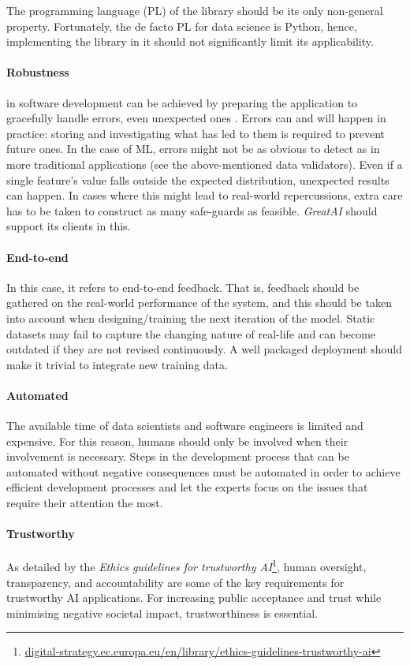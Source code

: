 The programming language (PL) of the library should be its only non-general property. Fortunately, the de facto PL for data science is Python, hence, implementing the library in it should not significantly limit its applicability.

\paragraph{Robustness} in software development can be achieved by preparing the application to gracefully handle errors, even unexpected ones \cite{bishop1998robust}. Errors can and will happen in practice: storing and investigating what has led to them is required to prevent future ones. In the case of ML, errors might not be as obvious to detect as in more traditional applications (see the above-mentioned data validators). Even if a single feature's value falls outside the expected distribution, unexpected results can happen. In cases where this might lead to real-world repercussions, extra care has to be taken to construct as many safe-guards as feasible. \textit{GreatAI} should support its clients in this.

\paragraph{End-to-end} In this case, it refers to end-to-end feedback. That is, feedback should be gathered on the real-world performance of the system, and this should be taken into account when designing/training the next iteration of the model. Static datasets may fail to capture the changing nature of real-life and can become outdated if they are not revised continuously. A well packaged deployment should make it trivial to integrate new training data.

\paragraph{Automated} The available time of data scientists and software engineers is limited and expensive. For this reason, humans should only be involved when their involvement is necessary. Steps in the development process that can be automated without negative consequences must be automated in order to achieve efficient development processes and let the experts focus on the issues that require their attention the most.

\paragraph{Trustworthy} As detailed by the \textit{Ethics guidelines for trustworthy AI}\footnote{\href{https://digital-strategy.ec.europa.eu/en/library/ethics-guidelines-trustworthy-ai}{digital-strategy.ec.europa.eu/en/library/ethics-guidelines-trustworthy-ai}}, human oversight, transparency, and accountability are some of the key requirements for trustworthy AI applications. For increasing public acceptance and trust while minimising negative societal impact, trustworthiness is essential.

